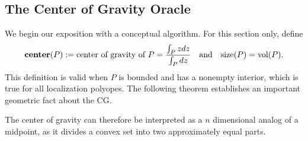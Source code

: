 
\subsection{The Center of Gravity Oracle} 

We begin our exposition with a conceptual algorithm. For this section
only, define
$$
\mbox{\bf center}(P) := \mbox{center of gravity of $P$} = \frac{\int_P z dz}{\int_P dz} \quad \mbox{and} \quad \mbox{size}(P) = \textnormal{vol}(P).
$$
This definition is valid when $P$ is bounded and has a nonempty interior,
which is true for all localization polyopes. The following theorem establishes
an important geometric fact about the CG.

The center of gravity can therefore be interpreted as a $n$ dimensional analog
of a midpoint, as it divides a convex set into two approximately equal parts.

